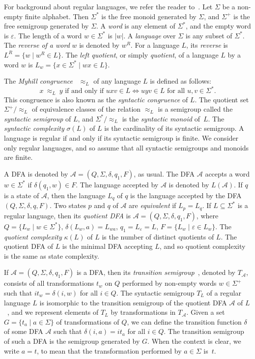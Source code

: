 \documentclass{llncs}
\newcommand{\eps}{\varepsilon}
\newcommand{\Sig}{\Sigma}
\newcommand{\sig}{\sigma}
\newcommand{\cA}{{\mathcal A}}
\newcommand{\lraL}{{\mathbin{\approx_L}}}
\begin{document}
\medskip

For background about regular languages, we refer the reader to~\cite{Yu97}. Let $\Sig$ be a non-empty finite alphabet. Then $\Sig^*$ is the free monoid generated by $\Sig$, and $\Sig^+$ is the free semigroup generated by $\Sig$. A \emph{word} is any element of $\Sig^*$, and the empty word is $\eps$. The length of a word $w\in \Sig^*$ is $|w|$. A \emph{language} over $\Sig$ is any subset of $\Sig^*$. The \emph{reverse of a word} $w$ is denoted by $w^R$. For a language $L$, its \emph{reverse} is $L^R = \{w \mid w^R \in L\}$. The \emph{left quotient}, or simply \emph{quotient}, of a language $L$ by a word $w$ is   $L_w=\{x\in \Sig^*\mid wx\in L \}$. 

The \emph{Myhill congruence}~\cite{Myh57} $\lraL$ of any language $L$ is defined as follows:
\begin{equation*}
x~\lraL~y \mbox{ if and only if } uxv\in L  \Leftrightarrow uyv\in L\mbox { for all } u,v\in\Sig^*.
\end{equation*}
This congruence is also known as the \emph{syntactic congruence} of $L$. The quotient set $\Sig^+/ \lraL$ of equivalence classes of the relation $\lraL$ is a semigroup called the \emph{syntactic semigroup} of $L$, and $\Sig^*/ \lraL$ is the \emph{syntactic monoid} of~$L$. 
The \emph{syntactic complexity} $\sig(L)$ of $L$ is the cardinality of its syntactic semigroup.
A language is regular if and only if its syntactic semigroup is finite. We consider only regular languages, and so assume that all syntactic semigroups and  monoids are finite.

A DFA is denoted by $\cA = (Q, \Sig, \delta, q_1, F)$, as usual. The DFA $\cA$ accepts a word $w \in \Sigma^*$ if ${\delta}(q_1,w)\in F$. The language accepted by $\cA$ is denoted by $L(\cA)$. If $q$ is a state of $\cA$, then the language $L_q$ of $q$ is the language accepted by the DFA $(Q,\Sigma,\delta,q,F)$. Two states $p$ and $q$ of $\cA$ are \emph{equivalent} if $L_p = L_q$. If $L \subseteq \Sig^*$ is a regular language, then its \emph{quotient DFA} is $\cA = (Q, \Sig, \delta, q_1, F)$, where $Q=\{L_w \mid w\in\Sig^*\}$, $\delta(L_w,a)=L_{wa}$, $q_1=L_\eps=L$,  $F=\{L_w \mid \eps \in L_w\}$. The \emph{quotient complexity} $\kappa(L)$ of $L$ is the number of distinct quotients of $L$. The quotient DFA of $L$ is the minimal DFA accepting $L$, and so quotient complexity is the same as state complexity. 


If $\cA = (Q, \Sig, \delta, q_1, F)$ is a DFA, then its \emph{transition semigroup}~\cite{Pin97}, denoted by $T_{\cA}$, consists of all transformations $t_w$ on $Q$ performed by non-empty words $w \in \Sig^+$ such that $it_w = \delta(i, w)$ for all $i \in Q$. The syntactic semigroup $T_L$ of a regular language $L$ is isomorphic to the transition semigroup of the quotient DFA $\cA$ of $L$~\cite{McNP71}, and we represent elements of $T_L$ by transformations in $T_{\cA}$. 
Given a set $G = \{t_a \mid a \in \Sig\}$ of transformations of $Q$, we can define the transition function $\delta$ of some DFA $\cA$ such that $\delta(i, a) = it_a$ for all $i \in Q$. The transition semigroup of such a DFA is the semigroup generated by $G$. When the context is clear, we write $a = t$,  to mean that the transformation performed by $a \in \Sig$ is~$t$.
\end{document}
